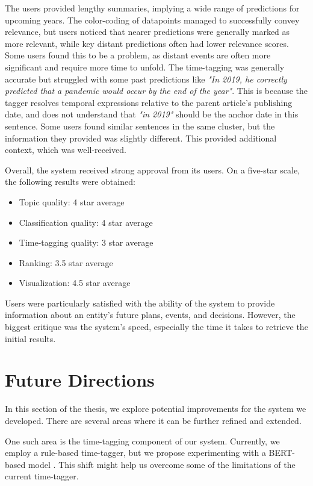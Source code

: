 \documentclass[12pt,oneside,bibtotoc,liststotoc]{scrbook}
\begin{document}
The users provided lengthy summaries, implying a wide range of predictions for upcoming years. The color-coding of datapoints managed to successfully convey relevance, but users noticed that nearer predictions were generally marked as more relevant, while key distant predictions often had lower relevance scores. Some users found this to be a problem, as distant events are often more significant and require more time to unfold. The time-tagging was generally accurate but struggled with some past predictions like \textit{"In 2019, he correctly predicted that a pandemic would occur by the end of the year"}. This is because the tagger resolves temporal expressions relative to the parent article's publishing date, and does not understand that \textit{"in 2019"} should be the anchor date in this sentence. Some users found similar sentences in the same cluster, but the information they provided was slightly different. This provided additional context, which was well-received.

Overall, the system received strong approval from its users. On a five-star scale, the following results were obtained:
\begin{itemize}
  \item Topic quality: 4 star average
  \item Classification quality: 4 star average
  \item Time-tagging quality: 3 star average
  \item Ranking: 3.5 star average
  \item Visualization: 4.5 star average
\end{itemize}
Users were particularly satisfied with the ability of the system to provide information about an entity's future plans, events, and decisions. However, the biggest critique was the system's speed, especially the time it takes to retrieve the initial results.

\chapter{Future Directions}
In this section of the thesis, we explore potential improvements for the system we developed. There are several areas where it can be further refined and extended.

One such area is the time-tagging component of our system. Currently, we employ a rule-based time-tagger, but we propose experimenting with a BERT-based model \cite{AlmasianTimetaggerBert}. This shift might help us overcome some of the limitations of the current time-tagger.
\end{document}
